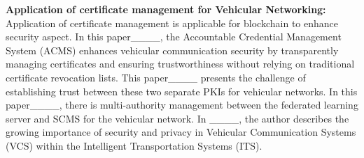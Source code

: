 \textbf{Application of certificate management for Vehicular Networking:} Application of certificate management is applicable for blockchain to enhance security aspect. In this paper____, the Accountable Credential Management System (ACMS) enhances vehicular communication security by transparently managing certificates and ensuring trustworthiness without relying on traditional certificate revocation lists. This paper____ presents the challenge of establishing trust between these two separate PKIs for vehicular networks. In this paper____, there is multi-authority management between the federated learning server and SCMS for the vehicular network. In ____, the author describes the growing importance of security and privacy in Vehicular Communication Systems (VCS) within the Intelligent Transportation Systems (ITS).      

%